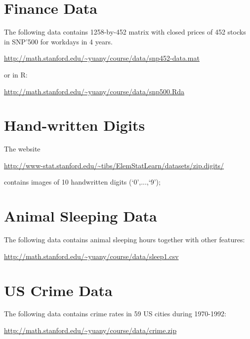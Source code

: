 \documentclass[11pt]{article}
\begin{document}
\section{Finance Data}
The following data contains 1258-by-452 matrix with closed prices of 452 stocks in SNP'500 for workdays in 4 years.

\url{http://math.stanford.edu/~yuany/course/data/snp452-data.mat} 

\noindent or in R: 

\url{http://math.stanford.edu/~yuany/course/data/snp500.Rda}


\section{Hand-written Digits} The website 

\url{http://www-stat.stanford.edu/\~tibs/ElemStatLearn/datasets/zip.digits/}

\noindent contains images of 10 handwritten digits (`$0$',...,`9');

\section{Animal Sleeping Data} The following data contains animal sleeping hours together with other features: 

\url{http://math.stanford.edu/~yuany/course/data/sleep1.csv}


\section{US Crime Data} The following data contains crime rates in 59 US cities during 1970-1992:

\url{http://math.stanford.edu/~yuany/course/data/crime.zip}

%
%
%
%
%
\end{document}
